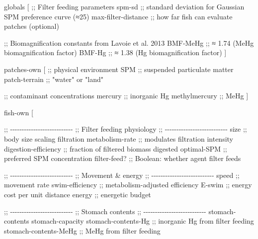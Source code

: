 \documentclass[
]{book}
\newenvironment{Shaded}{\begin{snugshade}}{\end{snugshade}}
\newcommand{\NormalTok}[1]{#1}
\begin{document}
\begin{Shaded}
\begin{Highlighting}[]

\NormalTok{globals [}
\NormalTok{  ;; Filter feeding parameters}
\NormalTok{  spm{-}sd                    ;; standard deviation for Gaussian SPM preference curve (≈25)}
\NormalTok{  max{-}filter{-}distance       ;; how far fish can evaluate patches (optional)}

\NormalTok{  ;; Biomagnification constants from Lavoie et al. 2013}
\NormalTok{  BMF{-}MeHg                  ;; ≈ 1.74 (MeHg biomagnification factor)}
\NormalTok{  BMF{-}Hg                    ;; ≈ 1.38 (Hg biomagnification factor)}
\NormalTok{]}

\NormalTok{patches{-}own [}
\NormalTok{  ;; physical environment}
\NormalTok{  SPM                         ;; suspended particulate matter}
\NormalTok{  patch{-}terrain               ;; "water" or "land"}

\NormalTok{  ;; contaminant concentrations}
\NormalTok{  mercury                     ;; inorganic Hg}
\NormalTok{  methylmercury               ;; MeHg}
\NormalTok{]}

\NormalTok{fish{-}own [}

\NormalTok{  ;; {-}{-}{-}{-}{-}{-}{-}{-}{-}{-}{-}{-}{-}{-}{-}{-}{-}{-}{-}{-}{-}{-}{-}{-}{-}{-}{-}}
\NormalTok{  ;; Filter feeding physiology}
\NormalTok{  ;; {-}{-}{-}{-}{-}{-}{-}{-}{-}{-}{-}{-}{-}{-}{-}{-}{-}{-}{-}{-}{-}{-}{-}{-}{-}{-}{-}}
\NormalTok{  size                          ;; body size scaling filtration}
\NormalTok{  metabolism{-}rate               ;; modulates filtration intensity}
\NormalTok{  digestion{-}efficiency          ;; fraction of filtered biomass digested}
\NormalTok{  optimal{-}SPM                   ;; preferred SPM concentration}
\NormalTok{  filter{-}feed?                  ;; Boolean: whether agent filter feeds}

\NormalTok{  ;; {-}{-}{-}{-}{-}{-}{-}{-}{-}{-}{-}{-}{-}{-}{-}{-}{-}{-}{-}{-}{-}{-}{-}{-}{-}{-}{-}}
\NormalTok{  ;; Movement \& energy}
\NormalTok{  ;; {-}{-}{-}{-}{-}{-}{-}{-}{-}{-}{-}{-}{-}{-}{-}{-}{-}{-}{-}{-}{-}{-}{-}{-}{-}{-}{-}}
\NormalTok{  speed                         ;; movement rate}
\NormalTok{  swim{-}efficiency               ;; metabolism{-}adjusted efficiency}
\NormalTok{  E{-}swim                        ;; energy cost per unit distance}
\NormalTok{  energy                        ;; energetic budget}

\NormalTok{  ;; {-}{-}{-}{-}{-}{-}{-}{-}{-}{-}{-}{-}{-}{-}{-}{-}{-}{-}{-}{-}{-}{-}{-}{-}{-}{-}{-}}
\NormalTok{  ;; Stomach contents}
\NormalTok{  ;; {-}{-}{-}{-}{-}{-}{-}{-}{-}{-}{-}{-}{-}{-}{-}{-}{-}{-}{-}{-}{-}{-}{-}{-}{-}{-}{-}}
\NormalTok{  stomach{-}contents}
\NormalTok{  stomach{-}capacity}
\NormalTok{  stomach{-}contents{-}Hg           ;; inorganic Hg from filter feeding}
\NormalTok{  stomach{-}contents{-}MeHg         ;; MeHg from filter feeding}


\end{Highlighting}
\end{Shaded}
\end{document}
